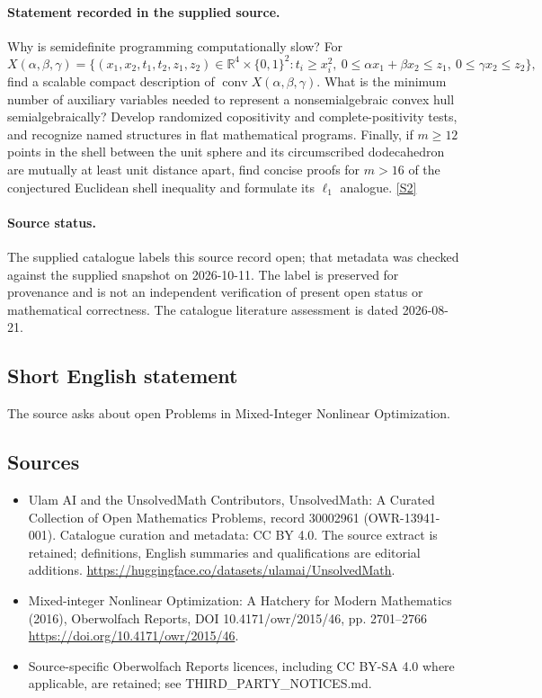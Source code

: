 \documentclass[11pt]{article}
\begin{document}
\paragraph{Statement recorded in the supplied source.}
Why is semidefinite programming computationally slow? For
$$X(\alpha,\beta,\gamma)=\{(x_1,x_2,t_1,t_2,z_1,z_2)\in\mathbb R^4\times\{0,1\}^2:t_i\geq x_i^2,\ 0\leq\alpha x_1+\beta x_2\leq z_1,\ 0\leq\gamma x_2\leq z_2\},$$
find a scalable compact description of $\operatorname{conv}X(\alpha,\beta,\gamma)$. What is the minimum number of auxiliary variables needed to represent a nonsemialgebraic convex hull semialgebraically? Develop randomized copositivity and complete-positivity tests, and recognize named structures in flat mathematical programs. Finally, if $m\geq12$ points in the shell between the unit sphere and its circumscribed dodecahedron are mutually at least unit distance apart, find concise proofs for $m>16$ of the conjectured Euclidean shell inequality and formulate its $\ell_1$ analogue. \href{https://doi.org/10.4171/owr/2015/46}{[S2]}
\paragraph{Source status.}
The supplied catalogue labels this source record open; that metadata was checked against the supplied snapshot on 2026-10-11. The label is preserved for provenance and is not an independent verification of present open status or mathematical correctness. The catalogue literature assessment is dated 2026-08-21.
\subsection{Short English statement}
The source asks about open Problems in Mixed-Integer Nonlinear Optimization.
\subsection{Sources}
\begin{itemize}
\item[S1] Ulam AI and the UnsolvedMath Contributors, UnsolvedMath: A Curated Collection of Open Mathematics Problems, record 30002961 (OWR-13941-001). Catalogue curation and metadata: CC BY 4.0. The source extract is retained; definitions, English summaries and qualifications are editorial additions.
\url{https://huggingface.co/datasets/ulamai/UnsolvedMath}.
\item[S2] Mixed-integer Nonlinear Optimization: A Hatchery for Modern Mathematics (2016), Oberwolfach Reports, DOI 10.4171/owr/2015/46, pp. 2701--2766
\url{https://doi.org/10.4171/owr/2015/46}.
\item Source-specific Oberwolfach Reports licences, including CC BY-SA 4.0 where applicable, are retained; see THIRD\_PARTY\_NOTICES.md.
\end{itemize}
\end{document}
